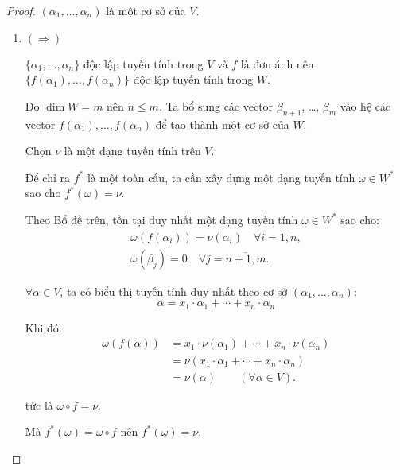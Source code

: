 \documentclass[class=nhvh-linear-algebra,crop=false]{standalone}
\begin{document}
\begin{proof}
    \par $(\alpha_{1}, \ldots, \alpha_{n})$ là một cơ sở của $V$.
    \begin{enumerate}[label = (\arabic*)]
        \item $(\Rightarrow)$
              \par $\{\alpha_{1}, \ldots, \alpha_{n}\}$ độc lập tuyến tính trong $V$ và $f$ là đơn ánh nên $\{f(\alpha_{1}), \ldots, f(\alpha_{n})\}$ độc lập tuyến tính trong $W$.
              \par Do $\dim W = m$ nên $n\le m$. Ta bổ sung các vector $\beta_{n+1}$, \ldots, $\beta_{m}$ vào hệ các vector $f(\alpha_{1}), \ldots, f(\alpha_{n})$ để tạo thành một cơ sở của $W$.
              \par Chọn $\nu$ là một dạng tuyến tính trên $V$.
              \par Để chỉ ra $f^{*}$ là một toàn cấu, ta cần xây dựng một dạng tuyến tính $\omega\in W^{*}$ sao cho $f^{*}(\omega) = \nu$.
              \par Theo Bổ đề trên, tồn tại duy nhất một dạng tuyến tính $\omega\in W^{*}$ sao cho:
              \[
                  \begin{split}
                      \omega(f(\alpha_{i})) = \nu(\alpha_{i})\quad\forall i = \overline{1, n}, \\
                      \omega(\beta_{j}) = 0 \quad\forall j = \overline{n+1, m}.
                  \end{split}
              \]
              \par $\forall \alpha\in V$, ta có biểu thị tuyến tính duy nhất theo cơ sở $(\alpha_{1}, \ldots, \alpha_{n})$:
              \[
                  \alpha = x_{1}\cdot\alpha_{1} + \cdots + x_{n}\cdot\alpha_{n}
              \]
              \par Khi đó:
              \begin{align*}
                  \omega(f(\alpha)) & = x_{1}\cdot\nu(\alpha_{1}) + \cdots + x_{n}\cdot\nu(\alpha_{n}) \\
                                    & = \nu(x_{1}\cdot\alpha_{1} + \cdots + x_{n}\cdot\alpha_{n})      \\
                                    & = \nu(\alpha)\qquad (\forall\alpha\in V).
              \end{align*}
              \par tức là $\omega\circ f = \nu$.
              \par Mà $f^{*}(\omega) = \omega\circ f$ nên $f^{*}(\omega) = \nu$.

\end{enumerate}
\end{proof}
\end{document}
